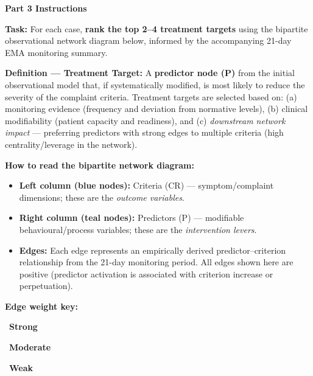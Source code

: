 \documentclass[11pt,a4paper]{article}
\begin{document}
\begin{tcolorbox}[colback=PartThreeBG,colframe=GoldAmber,arc=2.5mm,boxrule=0.9pt,left=10pt,right=10pt,top=9pt,bottom=9pt]
\textbf{\color{GoldAmber}Part 3 Instructions}

\smallskip
\textbf{Task:} For each case, \textbf{rank the top 2--4 treatment targets} using the bipartite observational network diagram below, informed by the accompanying 21-day EMA monitoring summary.

\textbf{Definition --- Treatment Target:} A \textbf{predictor node (P)} from the initial observational model that, if systematically modified, is most likely to reduce the severity of the complaint criteria. Treatment targets are selected based on: (a) monitoring evidence (frequency and deviation from normative levels), (b) clinical modifiability (patient capacity and readiness), and (c) \emph{downstream network impact} --- preferring predictors with strong edges to multiple criteria (high centrality/leverage in the network).

\textbf{How to read the bipartite network diagram:}
\begin{itemize}[topsep=3pt,itemsep=2pt]
\item \textbf{Left column (blue nodes):} Criteria (CR) --- symptom/complaint dimensions; these are the \emph{outcome variables}.
\item \textbf{Right column (teal nodes):} Predictors (P) --- modifiable behavioural/process variables; these are the \emph{intervention levers}.
\item \textbf{Edges:} Each edge represents an empirically derived predictor--criterion relationship from the 21-day monitoring period. All edges shown here are positive (predictor activation is associated with criterion increase or perpetuation).
\end{itemize}

\textbf{Edge weight key:}
\begin{center}\small
{}~\textbf{Strong}\quad
{}~\textbf{Moderate}\quad
{}~\textbf{Weak}
\end{center}


\end{tcolorbox}
\end{document}

